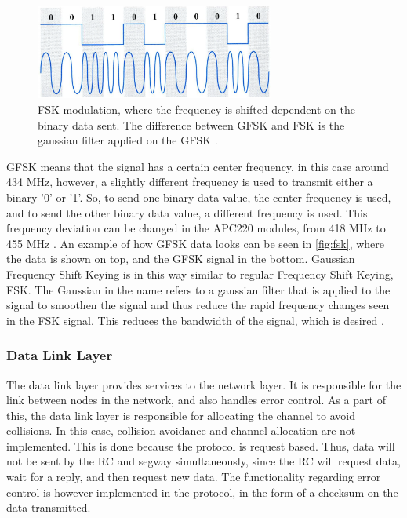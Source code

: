 \begin{figure}[H]
	\centering
	\includegraphics[width=0.7\textwidth]{figures/gfsk.png}
	\caption{FSK modulation, where the frequency is shifted dependent on the binary data sent. The difference between GFSK and FSK is the gaussian filter applied on the GFSK  \citep{sou:fsk_pic}.}
	\label{fig:fsk}
\end{figure}

GFSK means that the signal has a certain center frequency, in this case around 434 MHz, however, a slightly different frequency is used to transmit either a binary '0' or '1'. So, to send one binary data value, the center frequency is used, and to send the other binary data value, a different frequency is used. This frequency deviation can be changed in the APC220 modules, from 418 MHz to 455 MHz \citep[p. 2]{APC220}. An example of how GFSK data looks can be seen in \autoref{fig:fsk}, where the data is shown on top, and the GFSK signal in the bottom.
Gaussian Frequency Shift Keying is in this way similar to regular Frequency Shift Keying, FSK. The Gaussian in the name refers to a gaussian filter that is applied to the signal to smoothen the signal and thus reduce the rapid frequency changes seen in the FSK signal. This reduces the bandwidth of the signal, which is desired \citep{sou:gfsk}.

\subsubsection*{Data Link Layer}
The data link layer provides services to the network layer. It is responsible for the link between nodes in the network, and also handles error control. As a part of this, the data link layer is responsible for allocating the channel to avoid collisions. In this case, collision avoidance and channel allocation are not implemented. This is done because the protocol is request based. Thus, data will not be sent by the RC and segway simultaneously, since the RC will request data, wait for a reply, and then request new data. The functionality regarding error control is however implemented in the protocol, in the form of a checksum on the data transmitted.

